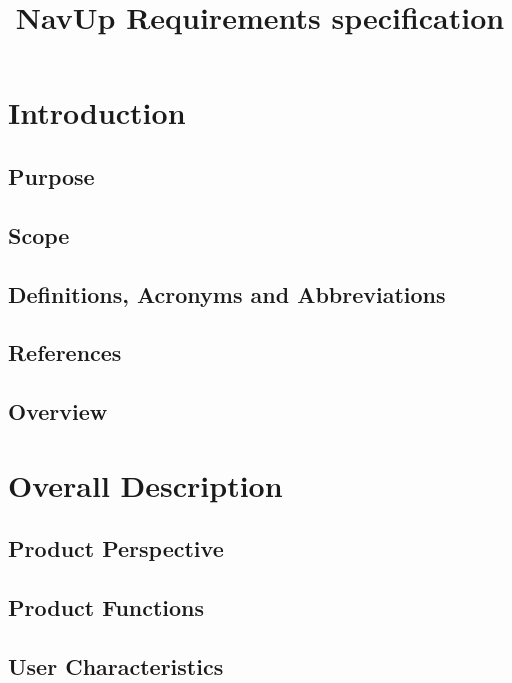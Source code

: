 \documentclass{article}
\begin{document}
\title{NavUp Requirements specification}
\maketitle
\section{Introduction}
	\subsection{Purpose}
	

	\subsection{Scope}
	
	
	\subsection{Definitions, Acronyms and Abbreviations}
	
	
	\subsection{References}
	
	
	\subsection{Overview}
	
	
\section{Overall Description}
	\subsection{Product Perspective}
	

	\subsection{Product Functions}
	
	
	\subsection{User Characteristics}
	
	
\end{document}

